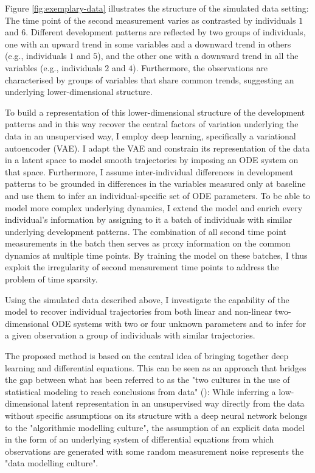 Figure \ref{fig:exemplary-data} illustrates the structure of the simulated data setting: The time point of the second measurement varies as contrasted by individuals $1$ and $6$. 
Different development patterns are reflected by two groups of individuals, one with an upward trend in some variables and a downward trend in others (e.g., individuals $1$ and $5$), and the other one with a downward trend in all the variables (e.g., individuals $2$ and $4$). 
Furthermore, the observations are characterised by groups of variables that share common trends, suggesting an underlying lower-dimensional structure. 

To build a representation of this lower-dimensional structure of the development patterns and in this way recover the central factors of variation underlying the data in an unsupervised way, I employ deep learning, specifically a variational autoencoder (VAE). I adapt the VAE and constrain its representation of the data in a latent space to model smooth trajectories by imposing an ODE system on that space. 
Furthermore, I assume inter-individual differences in development patterns to be grounded in differences in the variables measured only at baseline and use them to infer an individual-specific set of ODE parameters. 
To be able to model more complex underlying dynamics, I extend the model and enrich every individual's information by assigning to it a batch of individuals with similar underlying development patterns. The combination of all second time point measurements in the batch then serves as proxy information on the common dynamics at multiple time points. By training the model on these batches, I thus exploit the irregularity of second measurement time points to address the problem of time sparsity. 

Using the simulated data described above, I investigate the capability of the model to recover individual trajectories from both linear and non-linear two-dimensional ODE systems with two or four unknown parameters and to infer for a given observation a group of individuals with similar trajectories.

The proposed method is based on the central idea of bringing together deep learning and differential equations. This can be seen as an approach that bridges the gap between what has been referred to as the "two cultures in the use of statistical modeling to reach conclusions from data" (\cite[p.~1]{Breiman2001}): While inferring a low-dimensional latent representation in an unsupervised way directly from the data without specific assumptions on its structure with a deep neural network belongs to the "algorithmic modelling culture", the assumption of an explicit data model in the form of an underlying system of differential equations from which observations are generated with some random measurement noise represents the "data modelling culture".     

